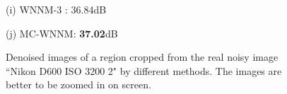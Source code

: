 \documentclass[10pt,onecolumn,letterpaper]{article}
\begin{document}
\begin{figure}[!htbp]
{\begin{minipage}[t]{0.25\textwidth}
{\footnotesize (i) WNNM-3 \cite{wnnm}: 36.84dB}
\end{minipage}
\begin{minipage}[t]{0.25\textwidth}
\centering
{}
{\footnotesize (j) MC-WNNM: \textbf{37.02}dB}
\end{minipage}
}
\caption{Denoised images of a region cropped from the real noisy image ``Nikon D600 ISO 3200 2" \cite{crosschannel2016} by different methods. The images are better to be zoomed in on screen.}
\label{f11}
\end{figure}
\end{document}
